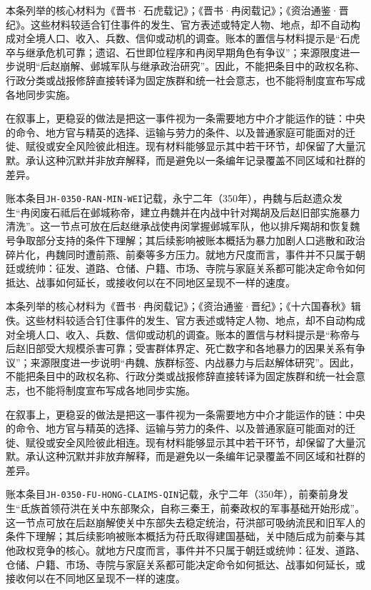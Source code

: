 本条列举的核心材料为《晋书·石虎载记》；《晋书·冉闵载记》；《资治通鉴·晋纪》。这些材料较适合钉住事件的发生、官方表述或特定人物、地点，却不自动构成对全境人口、收入、兵数、信仰或动机的调查。账本的置信与材料提示是“石虎卒与继承危机可靠；遗诏、石世即位程序和冉闵早期角色有争议”；来源限度进一步说明“后赵崩解、邺城军队与继承政治研究”。因此，不能把条目中的政权名称、行政分类或战报修辞直接转译为固定族群和统一社会意志，也不能将制度宣布写成各地同步实施。

在叙事上，更稳妥的做法是把这一事件视为一条需要地方中介才能运作的链：中央的命令、地方官与精英的选择、运输与劳力的条件、以及普通家庭可能面对的迁徙、赋役或安全风险彼此相连。现有材料能够显示其中若干环节，却保留了大量沉默。承认这种沉默并非放弃解释，而是避免以一条编年记录覆盖不同区域和社群的差异。

账本条目\texttt{JH-0350-RAN-MIN-WEI}记载，永宁二年（350年），冉魏与后赵遗众发生“冉闵废石祗后在邺城称帝，建立冉魏并在内战中针对羯胡及后赵旧部实施暴力清洗”。这一节点可放在后赵继承战使冉闵掌握邺城军队，他以排斥羯胡和恢复魏号争取部分支持的条件下理解；其后续影响被账本概括为暴力加剧人口逃散和政治碎片化，冉魏同时遭前燕、前秦等多方压力。就地方尺度而言，事件并不只属于朝廷或统帅：征发、道路、仓储、户籍、市场、寺院与家庭关系都可能决定命令如何抵达、战事如何延长，或接收何以在不同地区呈现不一样的速度。

本条列举的核心材料为《晋书·冉闵载记》；《资治通鉴·晋纪》；《十六国春秋》辑佚。这些材料较适合钉住事件的发生、官方表述或特定人物、地点，却不自动构成对全境人口、收入、兵数、信仰或动机的调查。账本的置信与材料提示是“称帝与后赵旧部受大规模杀害可靠；受害群体界定、死亡数字和各地暴力的因果关系有争议”；来源限度进一步说明“冉魏、族群标签、内战暴力与后赵解体研究”。因此，不能把条目中的政权名称、行政分类或战报修辞直接转译为固定族群和统一社会意志，也不能将制度宣布写成各地同步实施。

在叙事上，更稳妥的做法是把这一事件视为一条需要地方中介才能运作的链：中央的命令、地方官与精英的选择、运输与劳力的条件、以及普通家庭可能面对的迁徙、赋役或安全风险彼此相连。现有材料能够显示其中若干环节，却保留了大量沉默。承认这种沉默并非放弃解释，而是避免以一条编年记录覆盖不同区域和社群的差异。

账本条目\texttt{JH-0350-FU-HONG-CLAIMS-QIN}记载，永宁二年（350年），前秦前身发生“氐族首领苻洪在关中东部聚众，自称三秦王，前秦政权的军事基础开始形成”。这一节点可放在后赵崩解使关中东部失去稳定统治，苻洪部可吸纳流民和旧军人的条件下理解；其后续影响被账本概括为苻氏取得建国基础，关中随后成为前秦与其他政权竞争的核心。就地方尺度而言，事件并不只属于朝廷或统帅：征发、道路、仓储、户籍、市场、寺院与家庭关系都可能决定命令如何抵达、战事如何延长，或接收何以在不同地区呈现不一样的速度。

